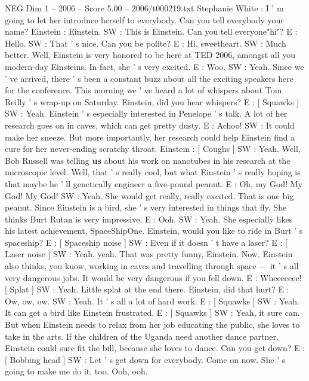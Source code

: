 \begin{textsample}{NEG Dim 1 – 2006 – Score 5.00 – 2006/t000219.txt}  \label{ex:f1_neg_070}
Stephanie White : I ' m going to let her introduce herself to everybody.
Can you tell everybody your name?
Einstein : Einstein.
SW : This is Einstein.
Can you tell everyone"hi"?
E : Hello.
SW : That ' s nice.
Can you be polite?
E : Hi, sweetheart.
SW : Much better.
Well, Einstein is very honored to be here at TED 2006, amongst all you modern-day Einsteins.
In fact, she ' s very excited.
E : Woo.
SW : Yeah.
Since we ' ve arrived, there ' s been a constant buzz about all the exciting speakers here for the conference.
This morning we ' ve heard a lot of whispers about Tom Reilly ' s wrap-up on Saturday.
Einstein, did you hear whispers?
E : [ Squawks ] SW : Yeah.
Einstein ' s especially interested in Penelope ' s talk.
A lot of her research goes on in caves, which can get pretty dusty.
E : Achoo!
SW : It could make her sneeze.
But more importantly, her research could help Einstein find a cure for her never-ending scratchy throat.
Einstein : [ Coughs ] SW : Yeah.
Well, Bob Russell was telling \textbf{us} about his work on nanotubes in his research at the microscopic level.
Well, that ' s really cool, but what Einstein ' s really hoping is that maybe he ' ll genetically engineer a five-pound peanut.
E : Oh, my God!
My God!
My God!
SW : Yeah.
She would get really, really excited.
That is one big peanut.
Since Einstein is a bird, she ' s very interested in things that fly.
She thinks Burt Rutan is very impressive.
E : Ooh.
SW : Yeah.
She especially likes his latest achievement, SpaceShipOne.
Einstein, would you like to ride in Burt ' s spaceship?
E : [ Spaceship noise ] SW : Even if it doesn ' t have a laser?
E : [ Laser noise ] SW : Yeah, yeah.
That was pretty funny, Einstein.
Now, Einstein also thinks, you know, working in caves and travelling through space — it ' s all very dangerous jobs.
It would be very dangerous if you fell down.
E : Wheeeeeee! [ Splat ] SW : Yeah.
Little splat at the end there.
Einstein, did that hurt?
E : Ow, ow, ow.
SW : Yeah.
It ' s all a lot of hard work.
E : [ Squawks ] SW : Yeah.
It can get a bird like Einstein frustrated.
E : [ Squawks ] SW : Yeah, it sure can.
But when Einstein needs to relax from her job educating the public, she loves to take in the arts.
If the children of the Uganda need another dance partner, Einstein could sure fit the bill, because she loves to dance.
Can you get down?
E : [ Bobbing head ] SW : Let ' s get down for everybody.
Come on now.
She ' s going to make me do it, too.
Ooh, ooh.

\end{textsample}
